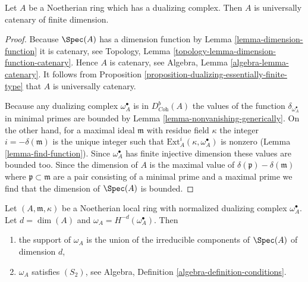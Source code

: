 \begin{lemma}
\label{lemma-universally-catenary}
Let $A$ be a Noetherian ring which has a dualizing
complex. Then $A$ is universally catenary of finite dimension.
\end{lemma}

\begin{proof}
Because $\Spec(A)$ has a dimension function by
Lemma \ref{lemma-dimension-function}
it is catenary, see
Topology, Lemma \ref{topology-lemma-dimension-function-catenary}.
Hence $A$ is catenary, see
Algebra, Lemma \ref{algebra-lemma-catenary}.
It follows from
Proposition \ref{proposition-dualizing-essentially-finite-type}
that $A$ is universally catenary.

\medskip\noindent
Because any dualizing complex $\omega_A^\bullet$ is
in $D^b_{\textit{Coh}}(A)$ the values of the function
$\delta_{\omega_A^\bullet}$ in minimal primes are bounded by
Lemma \ref{lemma-nonvanishing-generically}.
On the other hand, for a maximal ideal $\mathfrak m$ with
residue field $\kappa$ the integer $i = -\delta(\mathfrak m)$
is the unique integer such that
$\text{Ext}_A^i(\kappa, \omega_A^\bullet)$ is nonzero
(Lemma \ref{lemma-find-function}).
Since $\omega_A^\bullet$ has finite injective dimension
these values are bounded too. Since the dimension of
$A$ is the maximal value of $\delta(\mathfrak p) - \delta(\mathfrak m)$
where $\mathfrak p \subset \mathfrak m$ are a pair
consisting of a minimal prime and a maximal prime we find that the
dimension of $\Spec(A)$ is bounded.
\end{proof}

\begin{lemma}
\label{lemma-depth-dualizing-module}
Let $(A, \mathfrak m, \kappa)$ be a Noetherian local ring with
normalized dualizing complex $\omega_A^\bullet$. Let $d = \dim(A)$
and $\omega_A = H^{-d}(\omega_A^\bullet)$. Then
\begin{enumerate}
\item the support of $\omega_A$ is the union of the irreducible components
of $\Spec(A)$ of dimension $d$,
\item $\omega_A$ satisfies $(S_2)$, see
Algebra, Definition \ref{algebra-definition-conditions}.
\end{enumerate}
\end{lemma}

